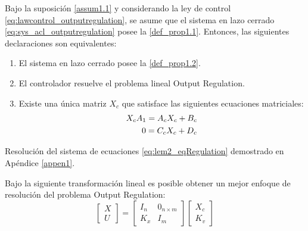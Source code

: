 \begin{mybox}{}
    \begin{lemma} \label{lem2:regulation_equation}
        Bajo la suposición \ref{assum1.1} y considerando la ley de control \eqref{eq:lawcontrol_outputregulation}, se asume que el sistema en lazo cerrado \eqref{eq:sys_acl_outputregulation} posee la \ref{def_prop1.1}. Entonces, las siguientes declaraciones son equivalentes:
        \begin{enumerate}
            \item El sistema en lazo cerrado posee la \ref{def_prop1.2}. 
            \item El controlador resuelve el problema lineal Output Regulation.
            \item Existe una única matriz $X_c$ que satisface las siguientes ecuaciones matriciales:
            \begin{align} \label{eq:lem2_eqRegulation}
                X_c A_1 = A_c X_c + B_c \notag \\
                0 = C_c X_c + D_c
            \end{align}
        \end{enumerate}
        \begin{remark}
            Resolución del sistema de ecuaciones \ref{eq:lem2_eqRegulation} demostrado en Apéndice \ref{appen1}.
        \end{remark}
    \end{lemma}
\end{mybox}

Bajo la siguiente transformación lineal es posible obtener un mejor enfoque de resolución del problema Output Regulation:
\begin{equation}
    \begin{bmatrix}
        X \\ U
    \end{bmatrix} = \begin{bmatrix}
        I_n & 0_{n\times m} \\ K_x & I_m
    \end{bmatrix} 
    \begin{bmatrix}
        X_c \\ K_v    
    \end{bmatrix}
\end{equation}

